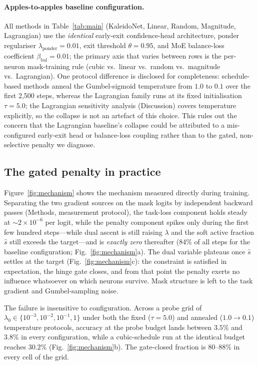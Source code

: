 \documentclass[fleqn,10pt]{article}
\begin{document}
\paragraph{Apples-to-apples baseline configuration.} All methods in
Table~\ref{tab:main} (KaleidoNet, Linear, Random, Magnitude,
Lagrangian) use the \emph{identical} early-exit confidence-head
architecture, ponder regulariser $\lambda_{\mathrm{ponder}}{=}0.01$,
exit threshold $\theta{=}0.95$, and MoE balance-loss coefficient
$\beta_{\mathrm{bal}}{=}0.01$; the primary axis that varies between
rows is the per-neuron mask-training rule (cubic vs.\ linear vs.\
random vs.\ magnitude vs.\ Lagrangian). One protocol difference is
disclosed for completeness: schedule-based methods anneal the
Gumbel-sigmoid temperature from $1.0$ to $0.1$ over the first
2{,}500 steps, whereas the Lagrangian family runs at its fixed
initialisation $\tau{=}5.0$; the Lagrangian sensitivity analysis
(Discussion) covers temperature explicitly, so the collapse is not
an artefact of this choice. This rules out the concern
that the Lagrangian baseline's collapse could be attributed to a
mis-configured early-exit head or balance-loss coupling rather than
to the gated, non-selective penalty we diagnose.

\subsection*{The gated penalty in practice}

Figure~\ref{fig:mechanism} shows the mechanism measured directly
during training. Separating the two gradient sources on the mask
logits by independent backward passes (Methods, measurement
protocol), the task-loss component holds steady at
${\sim}2\times10^{-6}$ per logit, while the penalty component
spikes only during the first few hundred steps---while dual ascent
is still raising $\lambda$ and the soft active fraction $\hat{s}$
still exceeds the target---and is \emph{exactly zero} thereafter
(84\% of all steps for the baseline configuration;
Fig.~\ref{fig:mechanism}a). The dual variable plateaus once
$\hat{s}$ settles at the target (Fig.~\ref{fig:mechanism}c): the
constraint is satisfied in expectation, the hinge gate closes, and
from that point the penalty exerts no influence whatsoever on which
neurons survive. Mask structure is left to the task gradient and
Gumbel-sampling noise.

The failure is insensitive to configuration. Across a probe grid of
$\lambda_0 \in \{10^{-3},10^{-2},10^{-1},1\}$ under both the fixed
($\tau{=}5.0$) and annealed ($1.0\!\to\!0.1$) temperature protocols,
accuracy at the probe budget lands between $3.5\%$ and $3.8\%$ in
every configuration, while a cubic-schedule run at the identical
budget reaches $30.2\%$ (Fig.~\ref{fig:mechanism}b). The gate-closed
fraction is $80$--$88\%$ in every cell of the grid.
\end{document}
